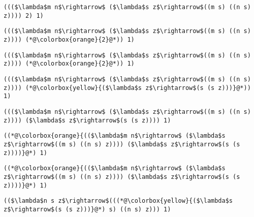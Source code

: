 \documentclass{beamer}
\begin{document}
\begin{frame}[fragile]{\CurrentSection}
\lstset{basicstyle=\ttfamily\small}\lstset{numbers=none}\lstset{language=ML}\begin{lstlisting}
((($\lambda$m n$\rightarrow$ ($\lambda$s z$\rightarrow$((m s) ((n s) z)))) 2) 1)
\end{lstlisting}
\pause\lstset{language=ML}\begin{lstlisting}
((($\lambda$m n$\rightarrow$ ($\lambda$s z$\rightarrow$((m s) ((n s) z)))) (*@\colorbox{orange}{2}@*)) 1)
\end{lstlisting}

\end{frame}

\begin{frame}[fragile]{\CurrentSection}
\lstset{basicstyle=\ttfamily\small}\lstset{numbers=none}\lstset{language=ML}\begin{lstlisting}
((($\lambda$m n$\rightarrow$ ($\lambda$s z$\rightarrow$((m s) ((n s) z)))) (*@\colorbox{orange}{2}@*)) 1)
\end{lstlisting}
\pause\lstset{language=ML}\begin{lstlisting}
((($\lambda$m n$\rightarrow$ ($\lambda$s z$\rightarrow$((m s) ((n s) z)))) (*@\colorbox{yellow}{($\lambda$s z$\rightarrow$(s (s z)))}@*)) 1)
\end{lstlisting}

\end{frame}

\begin{frame}[fragile]{\CurrentSection}
\lstset{basicstyle=\ttfamily\small}\lstset{numbers=none}\lstset{language=ML}\begin{lstlisting}
((($\lambda$m n$\rightarrow$ ($\lambda$s z$\rightarrow$((m s) ((n s) z)))) ($\lambda$s z$\rightarrow$(s (s z)))) 1)
\end{lstlisting}
\pause\lstset{language=ML}\begin{lstlisting}
((*@\colorbox{orange}{(($\lambda$m n$\rightarrow$ ($\lambda$s z$\rightarrow$((m s) ((n s) z)))) ($\lambda$s z$\rightarrow$(s (s z))))}@*) 1)
\end{lstlisting}

\end{frame}

\begin{frame}[fragile]{\CurrentSection}
\lstset{basicstyle=\ttfamily\small}\lstset{numbers=none}\lstset{language=ML}\begin{lstlisting}
((*@\colorbox{orange}{(($\lambda$m n$\rightarrow$ ($\lambda$s z$\rightarrow$((m s) ((n s) z)))) ($\lambda$s z$\rightarrow$(s (s z))))}@*) 1)
\end{lstlisting}
\pause\lstset{language=ML}\begin{lstlisting}
(($\lambda$n s z$\rightarrow$(((*@\colorbox{yellow}{($\lambda$s z$\rightarrow$(s (s z)))}@*) s) ((n s) z))) 1)
\end{lstlisting}

\end{frame}
\end{document}
